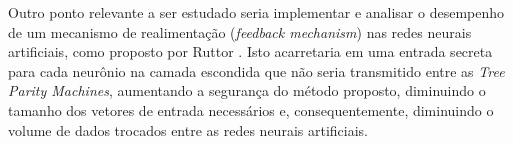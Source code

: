\documentclass[a4paper,10pt,oneside,conference,final,keeplastbox]{inatel}
\begin{document}
            Outro ponto relevante a ser estudado seria implementar e analisar o desempenho de um mecanismo de realimentação (\textit{feedback mechanism}) nas redes neurais artificiais, como proposto por Ruttor \cite{ruttor2007neural}. Isto acarretaria em uma entrada secreta para cada neurônio na camada escondida que não seria transmitido entre as \textit{Tree Parity Machines}, aumentando a segurança do método proposto, diminuindo o tamanho dos vetores de entrada necessários e, consequentemente, diminuindo o volume de dados trocados entre as redes neurais artificiais.
  
    
    

\flushend 
\end{document}
